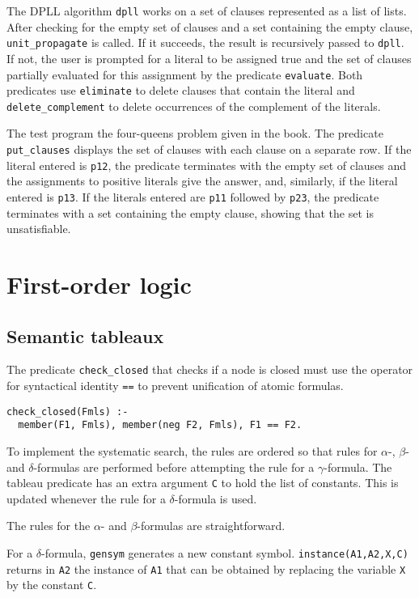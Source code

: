\documentclass[11pt]{article}
\newcommand*{\p}[1]{\textup{\texttt{#1}}}
\begin{document}
The DPLL algorithm \p{dpll} works on a set of clauses represented as a
list of lists. After checking for the empty set of clauses and a set
containing the empty clause, \p{unit\_propagate} is called. If it
succeeds, the result is recursively passed to \p{dpll}. If not, the user
is prompted for a literal to be assigned true and the set of clauses
partially evaluated for this assignment by the predicate \p{evaluate}.
Both predicates use \p{eliminate} to delete clauses that contain the
literal and \p{delete\_complement} to delete occurrences of the
complement of the literals.

The test program the four-queens problem given in the book. The
predicate \p{put\_clauses} displays the set of clauses with each clause
on a separate row. If the literal entered is \p{p12}, the predicate
terminates with the empty set of clauses and the assignments to positive
literals give the answer, and, similarly, if the literal entered is
\p{p13}. If the literals entered are \p{p11} followed by \p{p23}, the
predicate terminates with a set containing the empty clause, showing
that the set is unsatisfiable.

\section{First-order logic}

\subsection{Semantic tableaux}\label{s.tabfol}

The predicate \p{check\_closed} that checks if a node is closed must use
the operator for syntactical identity \p{==} to prevent unification of
atomic formulas.

\begin{verbatim}
check_closed(Fmls) :-
  member(F1, Fmls), member(neg F2, Fmls), F1 == F2.
\end{verbatim}

To implement the systematic search, the rules are ordered so that rules
for $\alpha$-, $\beta$- and $\delta$-formulas are performed before
attempting the rule for a $\gamma$-formula. The tableau predicate has an
extra argument \p{C} to hold the list of constants. This is updated
whenever the rule for a $\delta$-formula is used.

The rules for the $\alpha$- and $\beta$-formulas are straightforward.

For a $\delta$-formula, \p{gensym} generates a new constant symbol.
\p{instance(A1,A2,X,C)} returns in \p{A2} the instance of \p{A1} that
can be obtained by replacing the variable \p{X} by the constant \p{C}.
\end{document}
